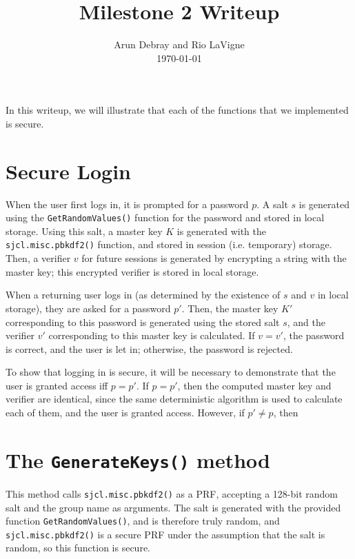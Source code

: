\documentclass{amsart}
\begin{document}
\title{Milestone 2 Writeup}
\author{Arun Debray and Rio LaVigne\\\today}
\maketitle
In this writeup, we will illustrate that each of the functions that we implemented is secure.
\section{Secure Login}%
When the user first logs in, it is prompted for a password $p$. A salt $s$ is generated using the \verb+GetRandomValues()+ function for the password and stored in local storage. Using this salt, a master key $K$ is generated with the \verb+sjcl.misc.pbkdf2()+ function, and stored in session (i.e. temporary) storage. Then, a verifier $v$ for future sessions is generated by encrypting a string with the master key; this encrypted verifier is stored in local storage.

When a returning user logs in (as determined by the existence of $s$ and $v$ in local storage), they are asked for a password $p'$. Then, the master key $K'$ corresponding to this password is generated using the stored salt $s$, and the verifier $v'$ corresponding to this master key is calculated. If $v = v'$, the password is correct, and the user is let in; otherwise, the password is rejected.

To show that logging in is secure, it will be necessary to demonstrate that the user is granted access iff $p  =p'$. If $p = p'$, then the computed master key and verifier are identical, since the same deterministic algorithm is used to calculate each of them, and the user is granted access. However, if $p'\ne p$, then

\section{The \texttt{GenerateKeys()} method}%
This method calls \verb+sjcl.misc.pbkdf2()+ as a PRF, accepting a 128-bit random salt and the group name as arguments. The salt is generated with the provided function \verb+GetRandomValues()+, and is therefore truly random, and \verb+sjcl.misc.pbkdf2()+ is a secure PRF under the assumption that the salt is random, so this function is secure.

\end{document}

